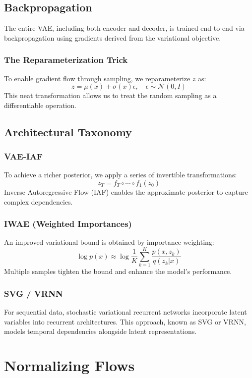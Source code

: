 \documentclass{article}
\begin{document}
\subsection{Backpropagation}
The entire VAE, including both encoder and decoder, is trained end-to-end via backpropagation using gradients derived from the variational objective.

\subsubsection{The Reparameterization Trick}
To enable gradient flow through sampling, we reparameterize \(z\) as:
\[
z = \mu(x) + \sigma(x)\epsilon, \quad \epsilon \sim \mathcal{N}(0, I)
\]
This neat transformation allows us to treat the random sampling as a differentiable operation.

\subsection{Architectural Taxonomy}

\subsubsection{VAE-IAF}
To achieve a richer posterior, we apply a series of invertible transformations:
\[
z_T = f_T \circ \cdots \circ f_1(z_0)
\]
Inverse Autoregressive Flow (IAF) enables the approximate posterior to capture complex dependencies.

\subsubsection{IWAE (Weighted Importances)}
An improved variational bound is obtained by importance weighting:
\[
\log p(x) \approx \log \frac{1}{K} \sum_{k=1}^{K} \frac{p(x,z_k)}{q(z_k|x)}
\]
Multiple samples tighten the bound and enhance the model's performance.

\subsubsection{SVG / VRNN}
For sequential data, stochastic variational recurrent networks incorporate latent variables into recurrent architectures. This approach, known as SVG or VRNN, models temporal dependencies alongside latent representations.
\clearpage\newpage

\section{Normalizing Flows} \label{sec:flows}
\end{document}
